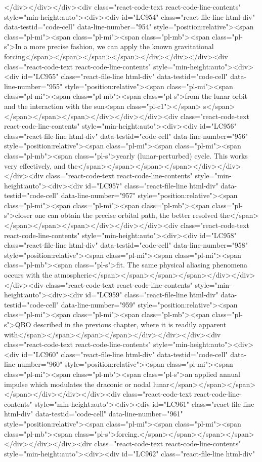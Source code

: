 {{{{{{{{{</div></div></div><div class="react-code-text react-code-line-contents" style="min-height:auto"><div><div id="LC954" class="react-file-line html-div" data-testid="code-cell" data-line-number="954" style="position:relative"><span class="pl-mi"><span class="pl-mi"><span class="pl-mb"><span class="pl-s">In a more precise fashion, we can apply the known gravitational forcing</span></span></span></span></div></div></div><div class="react-code-text react-code-line-contents" style="min-height:auto"><div><div id="LC955" class="react-file-line html-div" data-testid="code-cell" data-line-number="955" style="position:relative"><span class="pl-mi"><span class="pl-mi"><span class="pl-mb"><span class="pl-s">from the lunar orbit and the interaction with the sun<span class="pl-c1">\textquotesingle</span> s</span></span></span></span></div></div></div><div class="react-code-text react-code-line-contents" style="min-height:auto"><div><div id="LC956" class="react-file-line html-div" data-testid="code-cell" data-line-number="956" style="position:relative"><span class="pl-mi"><span class="pl-mi"><span class="pl-mb"><span class="pl-s">yearly (lunar-perturbed) cycle. This works very effectively, and the</span></span></span></span></div></div></div><div class="react-code-text react-code-line-contents" style="min-height:auto"><div><div id="LC957" class="react-file-line html-div" data-testid="code-cell" data-line-number="957" style="position:relative"><span class="pl-mi"><span class="pl-mi"><span class="pl-mb"><span class="pl-s">closer one can obtain the precise orbital path, the better resolved the</span></span></span></span></div></div></div><div class="react-code-text react-code-line-contents" style="min-height:auto"><div><div id="LC958" class="react-file-line html-div" data-testid="code-cell" data-line-number="958" style="position:relative"><span class="pl-mi"><span class="pl-mi"><span class="pl-mb"><span class="pl-s">fit. The same physical aliasing phenomena occurs with the atmospheric</span></span></span></span></div></div></div><div class="react-code-text react-code-line-contents" style="min-height:auto"><div><div id="LC959" class="react-file-line html-div" data-testid="code-cell" data-line-number="959" style="position:relative"><span class="pl-mi"><span class="pl-mi"><span class="pl-mb"><span class="pl-s">QBO described in the previous chapter, where it is readily apparent with</span></span></span></span></div></div></div><div class="react-code-text react-code-line-contents" style="min-height:auto"><div><div id="LC960" class="react-file-line html-div" data-testid="code-cell" data-line-number="960" style="position:relative"><span class="pl-mi"><span class="pl-mi"><span class="pl-mb"><span class="pl-s">an applied annual impulse which modulates the draconic or nodal lunar</span></span></span></span></div></div></div><div class="react-code-text react-code-line-contents" style="min-height:auto"><div><div id="LC961" class="react-file-line html-div" data-testid="code-cell" data-line-number="961" style="position:relative"><span class="pl-mi"><span class="pl-mi"><span class="pl-mb"><span class="pl-s">forcing.</span></span></span></span></div></div></div><div class="react-code-text react-code-line-contents" style="min-height:auto"><div><div id="LC962" class="react-file-line html-div" }}}}}}}}}

